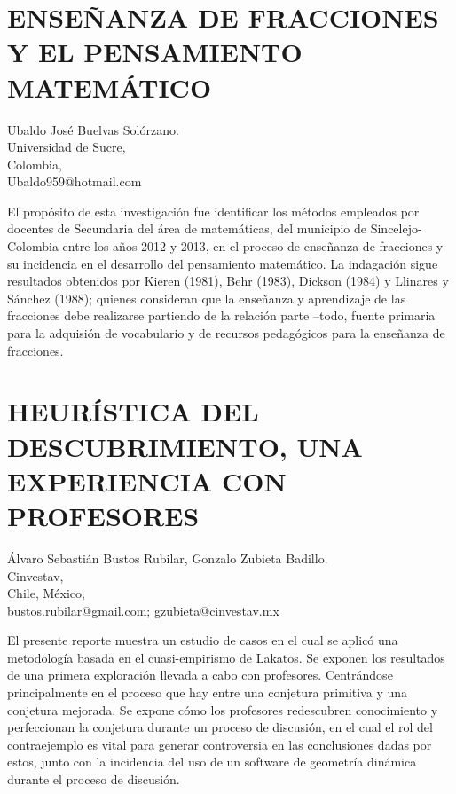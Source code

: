\section{ENSEÑANZA DE FRACCIONES Y EL PENSAMIENTO MATEMÁTICO}

\begin{datos}
Ubaldo José Buelvas Solórzano. \\
 Universidad de Sucre, \\
\hfill Colombia, \\
\hfill Ubaldo959@hotmail.com
\end{datos}

El propósito de esta investigación fue identificar los métodos empleados
por docentes de Secundaria del área de matemáticas, del municipio
de Sincelejo-Colombia entre los años 2012 y 2013, en el proceso de
enseñanza de fracciones y su incidencia en el desarrollo del pensamiento
matemático. La indagación sigue resultados obtenidos por Kieren (1981),
Behr (1983), Dickson (1984) y Llinares y Sánchez (1988); quienes consideran
que la enseñanza y aprendizaje de las fracciones debe realizarse partiendo
de la relación parte –todo, fuente primaria para la adquisión de vocabulario
y de recursos pedagógicos para la enseñanza de fracciones.


\section{HEURÍSTICA DEL DESCUBRIMIENTO, UNA EXPERIENCIA CON PROFESORES }

\begin{datos}
Álvaro Sebastián Bustos Rubilar, Gonzalo Zubieta Badillo. \\
 Cinvestav, \\
\hfill Chile, México, \\
\hfill bustos.rubilar@gmail.com; gzubieta@cinvestav.mx
\end{datos}

El presente reporte muestra un estudio de casos en el cual se aplicó
una metodología basada en el cuasi-empirismo de Lakatos. Se exponen
los resultados de una primera exploración llevada a cabo con profesores.
Centrándose principalmente en el proceso que hay entre una conjetura
primitiva y una conjetura mejorada. Se expone cómo los profesores
redescubren conocimiento y perfeccionan la conjetura durante un proceso
de discusión, en el cual el rol del contraejemplo es vital para generar
controversia en las conclusiones dadas por estos, junto con la incidencia
del uso de un software de geometría dinámica durante el proceso de
discusión.



